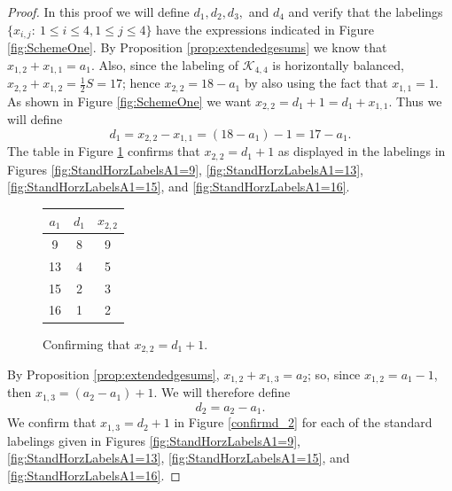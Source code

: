 \documentclass[10pt, reqno]{amsart}
\theoremstyle{definition}
\theoremstyle{plain}
\begin{document}
\begin{proof}
In this proof we will define $d_1, d_2, d_3,$ and $d_4$ and verify that the labelings  $\{x_{i,j} : \ 1\le i\le 4, 1\le j\le 4\}$ have the expressions indicated in Figure \ref{fig:SchemeOne}. By Proposition \ref{prop:extendedgesums} we know that $x_{1,2}+x_{1,1}=a_1$. Also, since the labeling of $\mathcal{K}_{4,4}$ is horizontally balanced, $x_{2,2}+x_{1,2}=\frac{1}{2}S=17$; hence $x_{2,2}=18-a_1$ by also using the fact that $x_{1,1}=1$. As shown in Figure \ref{fig:SchemeOne} we want $x_{2,2}=d_1+1=d_1+x_{1,1}$. Thus we will define
\begin{equation}
  d_1=x_{2,2}-x_{1,1}=(18-a_1)-1=17-a_1.  \label{defofd1}
\end{equation}
The table in Figure \ref{confirmd_1} confirms that $x_{2,2}=d_1+1$ as displayed in the labelings in Figures \ref{fig:StandHorzLabelsA1=9}, \ref{fig:StandHorzLabelsA1=13}, \ref{fig:StandHorzLabelsA1=15}, and \ref{fig:StandHorzLabelsA1=16}. 

\begin{figure}[hbt!]
\centering
\renewcommand{\arraystretch}{1.5}
\begin{tabular}{|c|c|c|} \hline
       $a_1$  & $d_1$ & $x_{2,2}$ \\  \hline
        9  & 8 & 9  \\  \hline
       13  &  4 & 5 \\  \hline
        15  & 2 & 3  \\  \hline
        16 & 1 & 2 \\ \hline
    \end{tabular}
\caption{Confirming that $x_{2,2}=d_1+1$.}\label{confirmd_1}
\end{figure}
By Proposition \ref{prop:extendedgesums}, $x_{1,2}+x_{1,3}=a_2$; so, since $x_{1,2}=a_1-1$, then $x_{1,3}=(a_2-a_1)+1$. We will therefore define 
\begin{equation}
d_2=a_2-a_1.   \label{defofd2}
\end{equation}
We confirm that $x_{1,3}=d_2+1$ in Figure \ref{confirmd_2} for each of the standard labelings given in Figures 
\ref{fig:StandHorzLabelsA1=9}, \ref{fig:StandHorzLabelsA1=13}, \ref{fig:StandHorzLabelsA1=15}, and \ref{fig:StandHorzLabelsA1=16}.


\end{proof}
\end{document}
